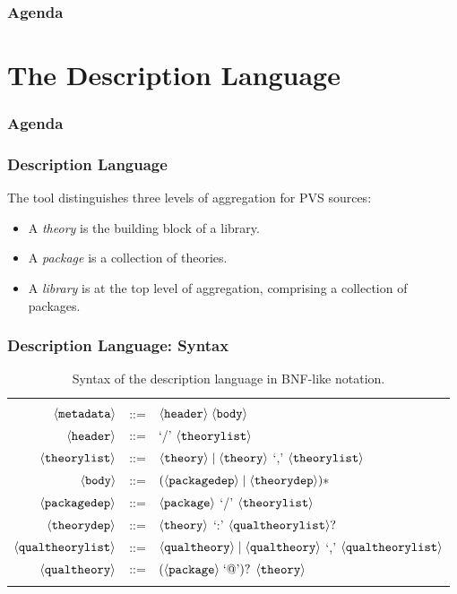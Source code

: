 \documentclass[mathserif,fleqn]{beamer}
\begin{document}
\begin{frame}
  \frametitle{Agenda}
  \tableofcontents
\end{frame}

\section{The Description Language}

\begin{frame}
  \frametitle{Agenda} 
  \tableofcontents[currentsection]
\end{frame}

\begin{frame}
  \frametitle{Description Language}

The  tool distinguishes three levels of aggregation for PVS
sources:

\begin{itemize}
  \item A {\em theory} is the building block of a library.

  \item A {\em package} is a collection of theories.

  \item A {\em library} is at the top level of aggregation, comprising
    a collection of packages.
\end{itemize}

\end{frame}

\begin{frame}
  \frametitle{Description Language: Syntax}
  {\small
    \begin{table}
    \begin{tabular}{r c p{6cm}}
      \hline \\
      $\langle{\textnormal{\texttt{metadata}}}\rangle$ & ::= & $\langle{\textnormal{\texttt{header}}}\rangle \; \langle{\textnormal{\texttt{body}}}\rangle$ \\
      $\langle{\textnormal{\texttt{header}}}\rangle$ & ::= & `/' $\langle{\textnormal{\texttt{theorylist}}}\rangle$ \\
      $\langle{\textnormal{\texttt{theorylist}}}\rangle$ & ::= & $\langle{\textnormal{\texttt{theory}}}\rangle \mid \langle{\textnormal{\texttt{theory}}}\rangle$ `,' $\langle{\textnormal{\texttt{theorylist}}}\rangle$ \\
      $\langle{\textnormal{\texttt{body}}}\rangle$ & ::= & $(\langle{\textnormal{\texttt{packagedep}}}\rangle \mid \langle{\textnormal{\texttt{theorydep}}}\rangle)*$ \\
      $\langle{\textnormal{\texttt{packagedep}}}\rangle$ & ::= & $\langle{\textnormal{\texttt{package}}}\rangle$ `/' $\langle{\textnormal{\texttt{theorylist}}}\rangle$ \\
      $\langle{\textnormal{\texttt{theorydep}}}\rangle$ & ::= & $\langle{\textnormal{\texttt{theory}}}\rangle$ `:' $\langle{\textnormal{\texttt{qualtheorylist}}}\rangle ?$ \\
      $\langle{\textnormal{\texttt{qualtheorylist}}}\rangle$ & ::= & $\langle{\textnormal{\texttt{qualtheory}}}\rangle \mid \langle{\textnormal{\texttt{qualtheory}}}\rangle$ `,' $\langle{\textnormal{\texttt{qualtheorylist}}}\rangle$ \\
      $\langle{\textnormal{\texttt{qualtheory}}}\rangle$ & ::= & $(\langle{\textnormal{\texttt{package}}}\rangle\; \text{`@'})?$ $\langle{\textnormal{\texttt{theory}}}\rangle$ \\
      \\
      \hline
    \end{tabular}
    \caption{Syntax of the description language in BNF-like notation.}
  \end{table}
  }
\end{frame}
\end{document}

